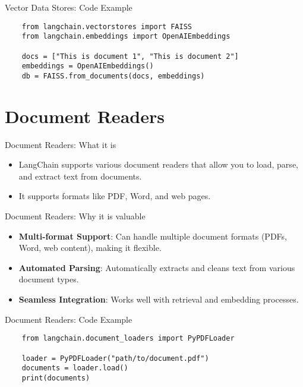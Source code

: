 \documentclass{beamer}
\begin{document}
\begin{frame}[fragile]{Vector Data Stores: Code Example}
    \begin{verbatim}
    from langchain.vectorstores import FAISS
    from langchain.embeddings import OpenAIEmbeddings

    docs = ["This is document 1", "This is document 2"]
    embeddings = OpenAIEmbeddings()
    db = FAISS.from_documents(docs, embeddings)
    \end{verbatim}
\end{frame}

\section{Document Readers}

\begin{frame}{Document Readers: What it is}
    \begin{itemize}
        \item LangChain supports various document readers that allow you to load, parse, and extract text from documents.
        \item It supports formats like PDF, Word, and web pages.
    \end{itemize}
\end{frame}

\begin{frame}{Document Readers: Why it is valuable}
    \begin{itemize}
        \item \textbf{Multi-format Support}: Can handle multiple document formats (PDFs, Word, web content), making it flexible.
        \item \textbf{Automated Parsing}: Automatically extracts and cleans text from various document types.
        \item \textbf{Seamless Integration}: Works well with retrieval and embedding processes.
    \end{itemize}
\end{frame}

\begin{frame}[fragile]{Document Readers: Code Example}
    \begin{verbatim}
    from langchain.document_loaders import PyPDFLoader

    loader = PyPDFLoader("path/to/document.pdf")
    documents = loader.load()
    print(documents)
    \end{verbatim}
\end{frame}
\end{document}
